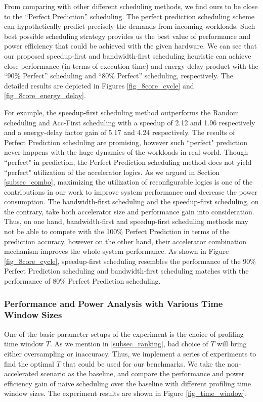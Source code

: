 From comparing with other different scheduling methods, we find ours
to be close to the ``Perfect Prediction'' scheduling. The perfect
prediction scheduling scheme can hypothetically predict precisely
the demands from incoming workloads. Such best possible scheduling
strategy provides us the best value of performance and power
efficiency that could be achieved with the given hardware. We can see that our proposed speedup-first and bandwidth-first scheduling heuristic can achieve close performance (in terms of execution time) and energy-delay-product with the ``90\% Perfect'' scheduling and ``80\% Perfect'' scheduling, respectively. The detailed
results are depicted in Figures \ref{fig_8core_cycle} and \ref{fig_8core_energy_delay}.  

For example, the speedup-first scheduling method outperforms the
Random scheduling and Acc-First scheduling with a speedup of 2.12 and
1.96 respectively and a energy-delay factor gain of 5.17 and 4.24
respectively. The results of Perfect Prediction scheduling are
promising, however such ``perfect" prediction never happens with the
huge dynamics of the workloads in real world. Though ``perfect" in
prediction, the Perfect Prediction scheduling method does not yield
``perfect" utilization of the accelerator logics. 
As we argued in Section \ref{subsec_combo}, maximizing the utilization of reconfigurable logics is one of the contributions in our work to improve system performance and decrease the power consumption. The bandwidth-first scheduling and the speedup-first scheduling, on the contrary, take both accelerator size and performance gain into consideration. Thus, on one hand, bandwidth-first and speedup-first scheduling methods may not be able to compete with the 100\% Perfect Prediction in terms of the prediction accuracy, however on the other hand, their accelerator combination mechanism improves the whole system performance. As shown in Figure \ref{fig_8core_cycle}, speedup-first scheduling resembles the performance of the 90\% Perfect Prediction scheduling and bandwidth-first scheduling matches with the performance of 80\% Perfect Prediction scheduling. 
\fi

\subsubsection{Performance and Power Analysis with Various Time Window Sizes}
One of the basic parameter setups of the experiment is the choice of profiling time window $T$. As we mention in \ref{subsec_ranking}, bad choice of $T$ will bring either oversampling or inaccuracy. Thus, we implement a series of experiments to find the optimal $T$ that could be used for our benchmarks. 
We take the non-accelerated scenario as the baseline, and compare the performance and power efficiency gain of naive scheduling over the baseline with different profiling time window sizes. The experiment results are shown in Figure \ref{fig_time_window}.


